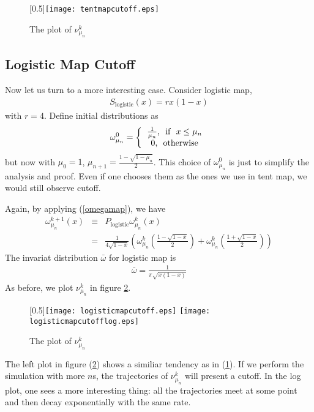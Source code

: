 \begin{figure}
\caption{\label{tentmapcutoff} The plot of $\nu_{\mu_n}^k$}
\centerline{\scalebox{0.5}[0.5]{\texttt{[image: tentmapcutoff.eps]}}}
\end{figure}




\subsection{Logistic Map Cutoff}
Now let us turn to a more interesting case. Consider logistic map,  
  \begin{eqnarray}
  \label{logisticmap}
    S_\text{logistic}(x) = rx(1-x)
  \end{eqnarray}
with $r = 4$. Define initial distributions as
  \begin{eqnarray}
  \label{logisticmapinitial}
    \omega_{\mu_n}^0 = \left\{ \begin{tabular}{c}
                      $\frac{1}{\mu_n}$, \mbox{  if  } $x \le \mu_n$\\ 
                      $0$, \mbox{  otherwise} 
                      \end{tabular}\right.
  \end{eqnarray}
but now with  $\mu_0=1$, $\mu_{n+1}=\frac{1-\sqrt{1-\mu_n}}{2}$. This choice of $\omega_{\mu_n}^0$ is just to simplify the analysis and proof. Even if one chooses them as the ones we use in tent map, we would still observe cutoff. 

Again, by applying (\ref{omegamap}), we have
 \begin{eqnarray}
 \label{logisticmapevolve}
    \omega_{\mu_n}^{k+1}(x) &\equiv &P_\text{logistic} \omega_{\mu_n}^{k}(x)\\
                            &     = &\frac{1}{4\sqrt{1-x}}\left( \omega_{\mu_n}^{k}\left( \frac{1-\sqrt{1-x}}{2}\right)
                                            +\omega_{\mu_n}^{k}\left( \frac{1+\sqrt{1-x}}{2}\right) \right)
 \end{eqnarray}
The invariat distribution $\bar{\omega}$ for logistic map is 
\begin{eqnarray} 
\label{logisticmapinvariant}
 \bar{\omega} = \frac{1}{\pi\sqrt{x(1-x)}}
\end{eqnarray}
As before, we plot $\nu_{\mu_n}^k$ in figure \ref{logisticmapcutoff}.

\begin{figure}
\caption{\label{logisticmapcutoff} The plot of $\nu_{\mu_n}^k$}
\centerline{\scalebox{0.5}[0.5]{\texttt{[image: logisticmapcutoff.eps]}
                                \texttt{[image: logisticmapcutofflog.eps]}}}
\end{figure}
The left plot in figure (\ref{logisticmapcutoff}) shows a similiar tendency as in (\ref{tentmapcutoff}). If we perform the simulation with more $n$s, the trajectories of $\nu_{\mu_n}^k$ will present a cutoff. In the log plot, one sees a more interesting thing: all the trajectories meet at some point and then decay exponentially with the same rate. 

